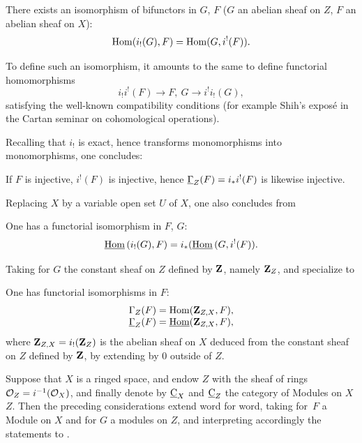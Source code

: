 \begin{proposition} \label{I.1.3}
There exists an isomorphism of bifunctors in $G$, $F$ ($G$ an abelian
sheaf on $Z$, $F$ an abelian sheaf on $X$):
\begin{equation} \label{eq:I.10} {\operatorname{Hom}(i_!(G), F) = \operatorname{Hom}(G, i^!(F))}.
\end{equation}
\end{proposition}

To define such an isomorphism, it amounts to the same to define
functorial homomorphisms
\[
i_!i^!(F) \to F, \ G \to i^!i_!(G),
\]
satisfying the well-known compatibility conditions (\cf for example
Shih's expos\'e in the Cartan seminar on cohomological operations).

Recalling that $i_!$ is exact, hence transforms monomorphisms into
monomorphisms, one concludes:

\begin{corollary} \label{I.1.4}
If $F$ is injective, $i^!(F)$ is injective, hence
$\underline{\Gamma}_Z(F) = i_*i^!(F)$ is likewise injective.
\end{corollary}

Replacing $X$ by a variable open set $U$ of $X$, one also concludes
from 

\begin{corollary} \label{I.1.5}
One has a functorial isomorphism in $F$, $G$:
\begin{equation} \label{eq:I.11}
\operatorname{\underline{Hom}}{(i_!(G), F)} =i_*(\operatorname{\underline{Hom}}{(G, i^!(F))}.
\end{equation}
\end{corollary}

Taking for $G$ the constant sheaf on $Z$ defined by $\mathbf{Z}$, namely
$\mathbf{Z}_Z$,  and  specialize to

\begin{corollary} \label{I.1.6}
One has functorial isomorphisms in $F$:
\begin{equation} \label{eq:I.12}
\begin{array}[c]{l} {\Gamma_Z(F)=\operatorname{Hom}(\mathbf{Z}_{Z, X}, F)}, \\
{\underline{\Gamma}_Z(F)=\operatorname{\underline{Hom}}(\mathbf{Z}_{Z, X}, F)},
\end{array}
\end{equation}
where $\mathbf{Z}_{Z, X}= i_!(\mathbf{Z}_Z)$ is the abelian sheaf on $X$ deduced
from the constant sheaf on $Z$ defined by $\mathbf{Z}$, by extending by $0$
outside of $Z$.
\end{corollary}

\begin{remark} \label{I.1.7}
Suppose that $X$ is a ringed space, and endow $Z$ with the sheaf of
rings ${\mathcal O}_Z=i^{-1}(\mathcal{O}_X)$, and finally denote by $\underline{\mathrm{C}}_X$ and
$\underline{\mathrm{C}}_Z$ the category of Modules on $X$ \resp $Z$. Then the preceding
considerations extend word for word, taking for~$F$ a Module on $X$
and for $G$ a modules on $Z$, and interpreting accordingly the
statements  to .
\end{remark}

